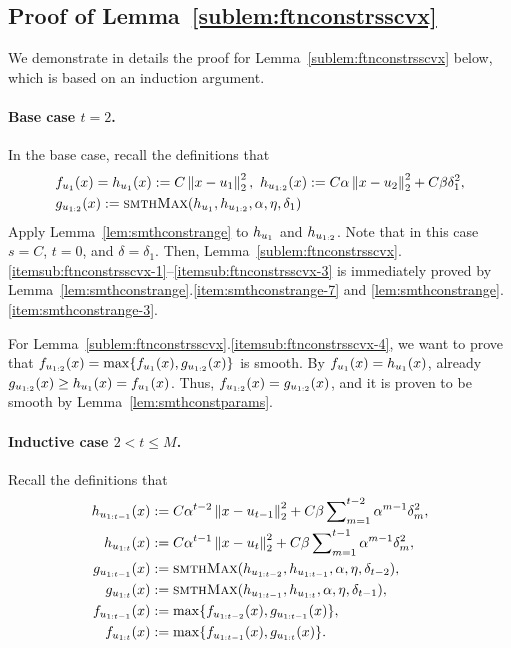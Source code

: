 \subsection{Proof of Lemma~\ref{sublem:ftnconstrsscvx}}
\label{sec:proof-ftnconstrsscvxsublem}
We demonstrate in details the proof for Lemma~\ref{sublem:ftnconstrsscvx} below,
which is based on an induction argument.
\paragraph{Base case $t=2$.}
In the base case, recall the definitions that
\begin{align*}
	&f_{u_1} (x) = h_{u_1}(x) := C\left\|{x-u_1}\right\|_2^2,~
	h_{u_{1:{2}}} (x) := C \alpha \left\|{x-u_{2}}\right\|_2^2 + C\beta \delta_1^2,\\
	&g_{u_{1:{2}}}(x) := \textsc{smthMax}(h_{u_1}, h_{u_{1:{2}}}, \alpha, \eta, \delta_1)
\end{align*}
Apply Lemma~\ref{lem:smthconstrange} to $h_{u_1}$ and $h_{u_{1:{2}}}$.
Note that in this case $s = C$, $t = 0$, and $\delta = \delta_1$.
Then, Lemma~\ref{sublem:ftnconstrsscvx}.\ref{itemsub:ftnconstrsscvx-1}--\ref{itemsub:ftnconstrsscvx-3} is immediately proved
by Lemma~\ref{lem:smthconstrange}.\ref{item:smthconstrange-7} and \ref{lem:smthconstrange}.\ref{item:smthconstrange-3}.

For Lemma~\ref{sublem:ftnconstrsscvx}.\ref{itemsub:ftnconstrsscvx-4}, we want to prove that
$f_{u_{1:{2}}}(x) = \max \{f_{u_1}(x), g_{u_{1:{2}}} (x)\}$ is smooth.
By $f_{u_1} (x) = h_{u_1}(x)$, already $g_{u_{1:{2}}} (x) \geq h_{u_1}(x) = f_{u_1} (x)$.
Thus, $f_{u_{1:{2}}}(x) = g_{u_{1:{2}}} (x)$, and it is proven to be smooth by Lemma~\ref{lem:smthconstparams}.

\paragraph{Inductive case $2<t \leq M$.}
Recall the definitions that
\begin{align*}
	h_{u_{1:{t-1}}}(x) &:= C\alpha^{t-2} \left\|{x-u_{t-1}}\right\|_2^2 + C \beta \sum\nolimits_{m=1}^{t-2} \alpha^{m-1}\delta_m^2,\\
	h_{u_{1:{t}}}(x) &:= C\alpha^{t-1} \left\|{x-u_{t}}\right\|_2^2 + C \beta \sum\nolimits_{m=1}^{t-1} \alpha^{m-1}\delta_m^2,\\
	g_{u_{1:{t-1}}}(x) &:= \textsc{smthMax}(h_{u_{1:{t-2}}}, h_{u_{1:{t-1}}}, \alpha, \eta, \delta_{t-2}),\\
	g_{u_{1:{t}}}(x) &:= \textsc{smthMax}(h_{u_{1:{t-1}}}, h_{u_{1:{t}}}, \alpha, \eta, \delta_{t-1}),\\
	f_{u_{1:{t-1}}}(x) &:= \max \{ f_{u_{1:{t-2}}} (x), g_{u_{1:{t-1}}}(x) \},\\
	f_{u_{1:{t}}}(x) &:= \max \{ f_{u_{1:{t-1}}} (x), g_{u_{1:{t}}}(x) \}.
\end{align*}

